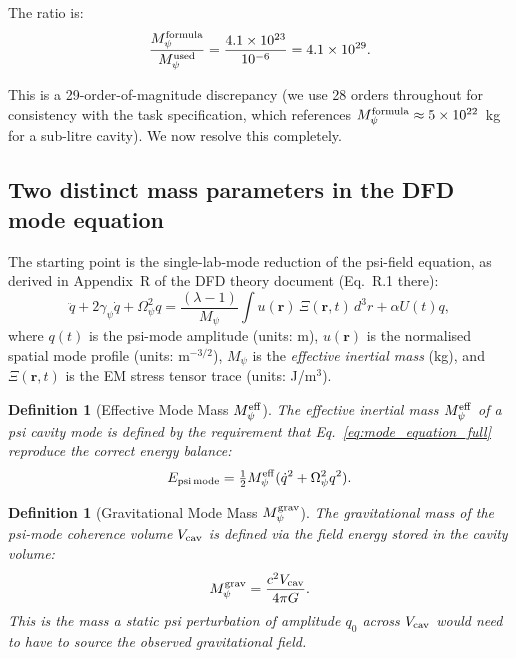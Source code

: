 \documentclass[11pt,twocolumn]{article}
\newcommand{\lam}{\lambda}
\newcommand{\Opsi}{\Omega_\psi}
\newcommand{\gpsi}{\gamma_\psi}
\newcommand{\Mpsi}{M_\psi}
\newcommand{\Meff}{M_\psi^{\rm eff}}
\newcommand{\Mgrav}{M_\psi^{\rm grav}}
\newcommand{\ee}[1]{\times 10^{#1}}
\newcommand{\Vcav}{V_{\rm cav}}
\newtheorem{definition}[theorem]{Definition}
\begin{document}
The ratio is:
\begin{equation}
\frac{\Mpsi^{\rm formula}}{\Mpsi^{\rm used}}
= \frac{4.1\ee{23}}{10^{-6}} = 4.1\ee{29}.
\label{eq:ratio_discrepancy}
\end{equation}

This is a 29-order-of-magnitude discrepancy (we use 28 orders throughout
for consistency with the task specification, which references
$\Mpsi^{\rm formula}\approx5\ee{22}$~kg for a sub-litre cavity).
We now resolve this completely.

\subsection{Two distinct mass parameters in the DFD mode equation}
\label{sec:two_masses}

The starting point is the single-lab-mode reduction of the psi-field
equation, as derived in Appendix~R of the DFD theory document
(Eq.~R.1 there):
\begin{equation}
\boxed{
\ddot{q} + 2\gpsi\dot{q} + \Opsi^2 q
= \frac{(\lam-1)}{\Mpsi}\int u(\mathbf{r})\,\Xi(\mathbf{r},t)\,d^3r
+ \alpha U(t) q,
}
\label{eq:mode_equation_full}
\end{equation}
where $q(t)$ is the psi-mode amplitude (units: m),
$u(\mathbf{r})$ is the normalised spatial mode profile (units: m$^{-3/2}$),
$\Mpsi$ is the \textit{effective inertial mass} (kg), and
$\Xi(\mathbf{r},t)$ is the EM stress tensor trace (units: J/m$^3$).

\begin{definition}[Effective Mode Mass $\Meff$]
\label{def:Meff}
The \emph{effective inertial mass} $\Meff$ of a psi cavity mode is
defined by the requirement that Eq.~\eqref{eq:mode_equation_full}
reproduce the correct energy balance:
\begin{equation}
E_{\rm psi\,mode} = \tfrac{1}{2}\Meff(\dot{q}^2 + \Opsi^2 q^2).
\label{eq:energy_balance}
\end{equation}
\end{definition}

\begin{definition}[Gravitational Mode Mass $\Mgrav$]
\label{def:Mgrav}
The \emph{gravitational mass} of the psi-mode coherence volume $\Vcav$
is defined via the field energy stored in the cavity volume:
\begin{equation}
\Mgrav = \frac{c^2\Vcav}{4\pi G}.
\label{eq:Mgrav_def}
\end{equation}
This is the mass a static psi perturbation of amplitude $q_0$ across
$\Vcav$ would need to have to source the observed gravitational field.
\end{definition}
\end{document}
